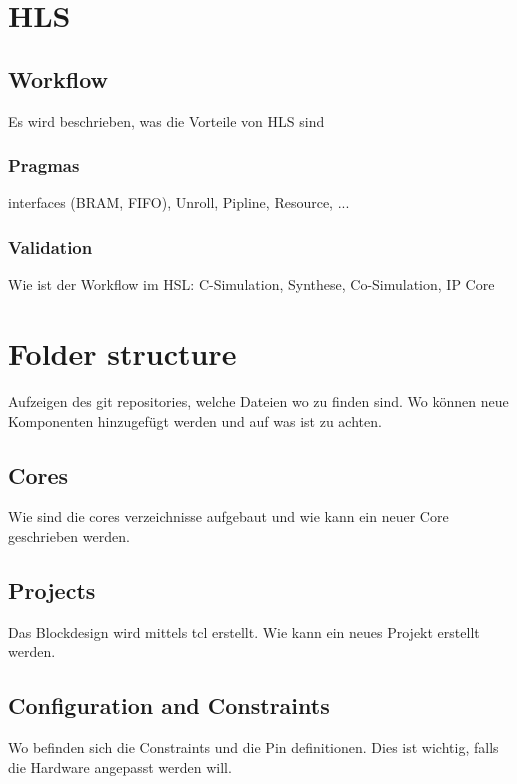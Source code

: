\section{HLS}
\subsection{Workflow}
Es wird beschrieben, was die Vorteile von HLS sind

\subsubsection{Pragmas}
interfaces (BRAM, FIFO), Unroll, Pipline, Resource, ...

\subsubsection{Validation}
Wie ist der Workflow im HSL: C-Simulation, Synthese, Co-Simulation, IP Core

\section{Folder structure}
Aufzeigen des git repositories, welche Dateien wo zu finden sind. Wo können neue
Komponenten hinzugefügt werden und auf was ist zu achten.

\subsection{Cores}
Wie sind die cores verzeichnisse aufgebaut und wie kann ein neuer Core geschrieben 
werden.

\subsection{Projects}
Das Blockdesign wird mittels tcl erstellt. Wie kann ein neues Projekt erstellt werden.

\subsection{Configuration and Constraints}
Wo befinden sich die Constraints und die Pin definitionen. Dies ist wichtig,
falls die Hardware angepasst werden will.

